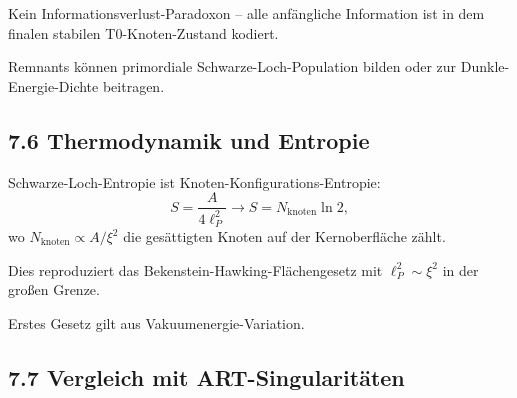 	Kein Informationsverlust-Paradoxon – alle anfängliche Information ist in dem finalen stabilen T0-Knoten-Zustand kodiert.
	
	Remnants können primordiale Schwarze-Loch-Population bilden oder zur Dunkle-Energie-Dichte beitragen.
	
	\subsection{7.6 Thermodynamik und Entropie}
	
	Schwarze-Loch-Entropie ist Knoten-Konfigurations-Entropie:
	\[
	S = \frac{A}{4 \ell_P^2} \to S = N_{\text{knoten}} \ln 2,
	\]
	wo $N_{\text{knoten}} \propto A / \xi^2$ die gesättigten Knoten auf der Kernoberfläche zählt.
	
	Dies reproduziert das Bekenstein-Hawking-Flächengesetz mit $\ell_P^2 \sim \xi^2$ in der großen Grenze.
	
	Erstes Gesetz gilt aus Vakuumenergie-Variation.
	
	\subsection{7.7 Vergleich mit ART-Singularitäten}
	
	\begin{table}[htbp]
		\centering
		\caption{Schwarze-Loch-Interieur-Vergleich}
		\label{tab:sl}
	\end{table}
	
